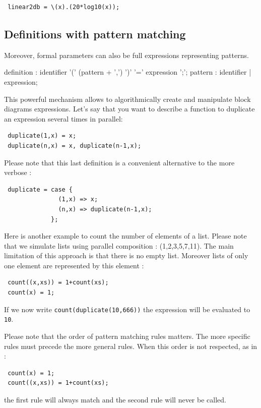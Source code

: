 \begin{lstlisting}
 linear2db = \(x).(20*log10(x));
\end{lstlisting}

\subsection{Definitions with pattern matching}

Moreover, formal parameters can also be full expressions representing patterns. 
\begin{rail}
definition  : identifier '(' (pattern + ',')  ')' '=' expression ';';
pattern : identifier | expression; 
\end{rail}

This powerful mechanism allows to algorithmically create and manipulate block diagrams expressions. Let's say that you want to describe a function to duplicate an expression several times in parallel:
\begin{lstlisting}
 duplicate(1,x) = x;
 duplicate(n,x) = x, duplicate(n-1,x);
\end{lstlisting}

Please note that this last definition is a convenient alternative to the more verbose :
\begin{lstlisting}
 duplicate = case { 
               (1,x) => x; 
               (n,x) => duplicate(n-1,x); 
             };
\end{lstlisting}

Here is another example to count the number of elements of a list. Please note that we simulate lists using parallel composition : (1,2,3,5,7,11). The main limitation of this approach is that there is no empty list. Moreover lists of only one element are represented by this element :
\begin{lstlisting}
 count((x,xs)) = 1+count(xs);
 count(x) = 1;
\end{lstlisting}

If we now write \lstinline'count(duplicate(10,666))' the expression will be evaluated to \lstinline'10'.

Please note that the order of pattern matching rules matters. The more specific rules must precede the more general rules. When this order is not respected, as in :
\begin{lstlisting}
 count(x) = 1;
 count((x,xs)) = 1+count(xs);
\end{lstlisting}
the first rule will always match and the second rule will never be called.

